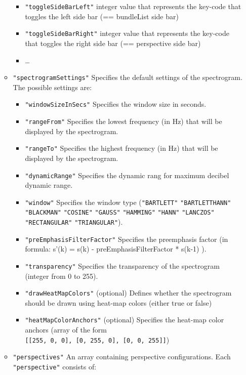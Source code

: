 \documentclass[]{book}
\begin{document}
\begin{itemize}
\begin{itemize}
    \begin{itemize}
    \item
      \texttt{"toggleSideBarLeft"} integer value that represents the
      key-code that toggles the left side bar (== bundleList side
      bar)
    \item
      \texttt{"toggleSideBarRight"} integer value that represents the
      key-code that toggles the right side bar (== perspective
      side bar)
    \item
      \ldots{}
    \end{itemize}
  \item
    \texttt{"spectrogramSettings"} Specifies the default settings of the
    spectrogram. The possible settings are:

    \begin{itemize}
    \item
      \texttt{"windowSizeInSecs"} Specifies the window size in seconds.
    \item
      \texttt{"rangeFrom"} Specifies the lowest frequency (in Hz) that
      will be displayed by the spectrogram.
    \item
      \texttt{"rangeTo"} Specifies the highest frequency (in Hz) that
      will be displayed by the spectrogram.
    \item
      \texttt{"dynamicRange"} Specifies the dynamic rang for maximum
      decibel dynamic range.
    \item
      \texttt{"window"} Specifies the window type (\texttt{"BARTLETT"}
      \texttt{"BARTLETTHANN"} \texttt{"BLACKMAN"} \texttt{"COSINE"} \texttt{"GAUSS"}
      \texttt{"HAMMING"} \texttt{"HANN"} \texttt{"LANCZOS"} \texttt{"RECTANGULAR"}
      \texttt{"TRIANGULAR"}).
    \item
      \texttt{"preEmphasisFilterFactor"} Specifies the preemphasis factor
      (in formula: s'(k) = s(k) - preEmphasisFilterFactor *
      s(k-1) ).
    \item
      \texttt{"transparency"} Specifies the transparency of the
      spectrogram (integer from 0 to 255).
    \item
      \texttt{"drawHeatMapColors"} (optional) Defines whether the
      spectrogram should be drawn using heat-map colors (either
      true or false)
    \item
      \texttt{"heatMapColorAnchors"} (optional) Specifies the heat-map color anchors (array of the form \texttt{{[}{[}255,\ 0,\ 0{]},\ {[}0,\ 255,\ 0{]},\ {[}0,\ 0,\ 255{]}{]}})
    \end{itemize}
  \item
    \texttt{"perspectives"} An array containing perspective configurations.
    Each \texttt{"perspective"} consists of:


\end{itemize}
\end{itemize}
\end{document}
